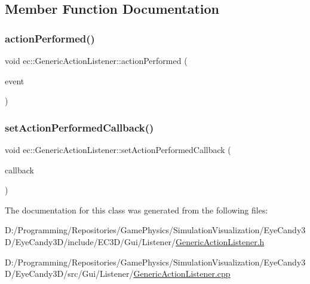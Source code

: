 \subsection{Member Function Documentation}
\mbox{\label{classec_1_1_generic_action_listener_a559a752b60543f5deabfccb2eb6efaf8}} 
\subsubsection{\texorpdfstring{action\+Performed()}{actionPerformed()}}
{\footnotesize\ttfamily void ec\+::\+Generic\+Action\+Listener\+::action\+Performed (\begin{DoxyParamCaption}\item[{const agui\+::\+Action\+Event \&}]{event }\end{DoxyParamCaption})\hspace{0.3cm}{\ttfamily [override]}}

\mbox{\label{classec_1_1_generic_action_listener_ae824ead75dce8eae0910da7432e3c400}} 
\subsubsection{\texorpdfstring{set\+Action\+Performed\+Callback()}{setActionPerformedCallback()}}
{\footnotesize\ttfamily void ec\+::\+Generic\+Action\+Listener\+::set\+Action\+Performed\+Callback (\begin{DoxyParamCaption}\item[{const \mbox{\hyperlink{classec_1_1_generic_action_listener_ab58c5e9b4caf14e4d1b1e50ffff5e628}{Action\+Performed\+\_\+\+Callback}} \&}]{callback }\end{DoxyParamCaption})}



The documentation for this class was generated from the following files\+:\begin{DoxyCompactItemize}
\item 
D\+:/\+Programming/\+Repositories/\+Game\+Physics/\+Simulation\+Visualization/\+Eye\+Candy3\+D/\+Eye\+Candy3\+D/include/\+E\+C3\+D/\+Gui/\+Listener/\mbox{\hyperlink{_generic_action_listener_8h}{Generic\+Action\+Listener.\+h}}\item 
D\+:/\+Programming/\+Repositories/\+Game\+Physics/\+Simulation\+Visualization/\+Eye\+Candy3\+D/\+Eye\+Candy3\+D/src/\+Gui/\+Listener/\mbox{\hyperlink{_generic_action_listener_8cpp}{Generic\+Action\+Listener.\+cpp}}\end{DoxyCompactItemize}
